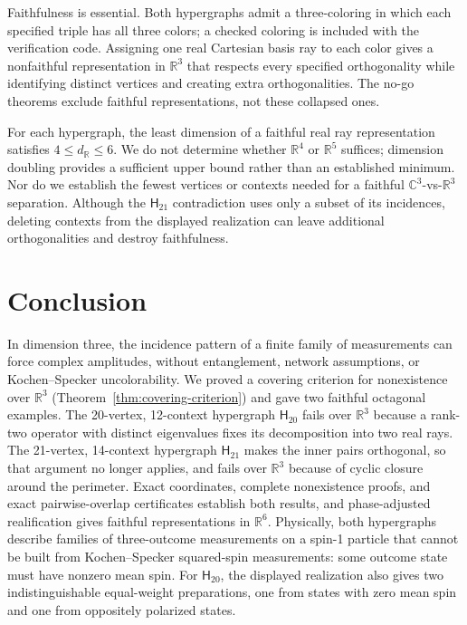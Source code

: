 \documentclass[twocolumn,aps,pra,floatfix,amsmath,amssymb,longbibliography]{revtex4-2}
\newenvironment{handrewrite}{\leavevmode\color{blue}}{}
\theoremstyle{definition}
\theoremstyle{remark}
\newcommand{\C}{\mathbb C}
\newcommand{\R}{\mathbb R}
\newcommand{\Htwenty}{\mathsf H_{20}}
\newcommand{\Htwentyone}{\mathsf H_{21}}
\begin{document}
Faithfulness is essential.  Both hypergraphs admit a three-coloring
in which each specified triple has all three colors; a checked coloring
is included with the verification code.  Assigning one real Cartesian
basis ray to each color gives a nonfaithful representation in $\R^3$
that respects every specified orthogonality while identifying distinct
vertices and creating extra orthogonalities.  The no-go theorems exclude
faithful representations, not these collapsed ones.

For each hypergraph, the least dimension of a faithful real ray
representation satisfies $4\le d_{\R}\le6$.  We do not determine whether
$\R^4$ or $\R^5$ suffices; dimension doubling provides a sufficient
upper bound rather than an established minimum.  Nor do we establish the
fewest vertices or contexts needed for a faithful $\C^3$-vs-$\R^3$
separation.  Although the $\Htwentyone$ contradiction uses only a subset of
its incidences, deleting contexts from the displayed realization can leave
additional orthogonalities and destroy faithfulness.

\section{Conclusion}
\label{sec:conclusion}

\begin{handrewrite}
In dimension three, the incidence pattern of a finite family of measurements
can force complex amplitudes, without entanglement, network assumptions, or
Kochen--Specker uncolorability.  We proved a covering criterion for
nonexistence over $\R^3$ (Theorem~\ref{thm:covering-criterion}) and gave two
faithful octagonal examples.  The 20-vertex, 12-context hypergraph $\Htwenty$
fails over $\R^3$ because a rank-two operator with distinct eigenvalues fixes
its decomposition into two real rays.  The 21-vertex, 14-context hypergraph
$\Htwentyone$ makes the inner pairs orthogonal, so that argument no longer
applies, and fails over $\R^3$ because of cyclic closure around the
perimeter.  Exact coordinates, complete nonexistence proofs, and exact
pairwise-overlap certificates establish both results, and phase-adjusted
realification gives faithful representations in $\R^6$.  Physically, both
hypergraphs describe families of three-outcome measurements on a spin-1
particle that cannot be built from Kochen--Specker squared-spin measurements:
some outcome state must have nonzero mean spin.  For $\Htwenty$, the displayed
realization also gives two indistinguishable equal-weight preparations, one
from states with zero mean spin and one from oppositely polarized states.
\end{handrewrite}
\end{document}
